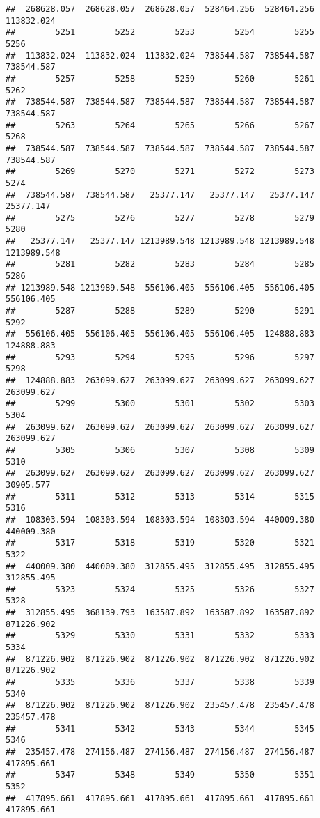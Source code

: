 \documentclass[
]{book}
\begin{document}
\begin{verbatim}
##  268628.057  268628.057  268628.057  528464.256  528464.256  113832.024 
##        5251        5252        5253        5254        5255        5256 
##  113832.024  113832.024  113832.024  738544.587  738544.587  738544.587 
##        5257        5258        5259        5260        5261        5262 
##  738544.587  738544.587  738544.587  738544.587  738544.587  738544.587 
##        5263        5264        5265        5266        5267        5268 
##  738544.587  738544.587  738544.587  738544.587  738544.587  738544.587 
##        5269        5270        5271        5272        5273        5274 
##  738544.587  738544.587   25377.147   25377.147   25377.147   25377.147 
##        5275        5276        5277        5278        5279        5280 
##   25377.147   25377.147 1213989.548 1213989.548 1213989.548 1213989.548 
##        5281        5282        5283        5284        5285        5286 
## 1213989.548 1213989.548  556106.405  556106.405  556106.405  556106.405 
##        5287        5288        5289        5290        5291        5292 
##  556106.405  556106.405  556106.405  556106.405  124888.883  124888.883 
##        5293        5294        5295        5296        5297        5298 
##  124888.883  263099.627  263099.627  263099.627  263099.627  263099.627 
##        5299        5300        5301        5302        5303        5304 
##  263099.627  263099.627  263099.627  263099.627  263099.627  263099.627 
##        5305        5306        5307        5308        5309        5310 
##  263099.627  263099.627  263099.627  263099.627  263099.627   30905.577 
##        5311        5312        5313        5314        5315        5316 
##  108303.594  108303.594  108303.594  108303.594  440009.380  440009.380 
##        5317        5318        5319        5320        5321        5322 
##  440009.380  440009.380  312855.495  312855.495  312855.495  312855.495 
##        5323        5324        5325        5326        5327        5328 
##  312855.495  368139.793  163587.892  163587.892  163587.892  871226.902 
##        5329        5330        5331        5332        5333        5334 
##  871226.902  871226.902  871226.902  871226.902  871226.902  871226.902 
##        5335        5336        5337        5338        5339        5340 
##  871226.902  871226.902  871226.902  235457.478  235457.478  235457.478 
##        5341        5342        5343        5344        5345        5346 
##  235457.478  274156.487  274156.487  274156.487  274156.487  417895.661 
##        5347        5348        5349        5350        5351        5352 
##  417895.661  417895.661  417895.661  417895.661  417895.661  417895.661 

\end{verbatim}
\end{document}
